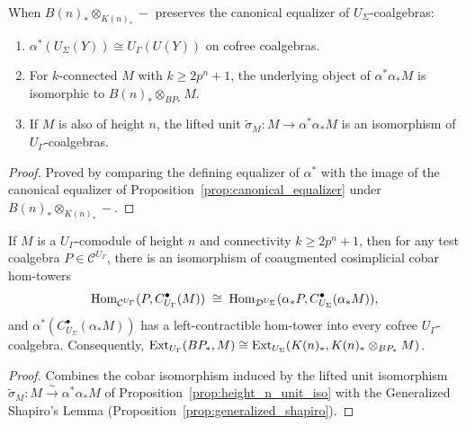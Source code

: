 \begin{proposition}
  \label{prop:height_n_unit_iso}
  \leanok
  When $B(n)_* \otimes_{K(n)_*} -$ preserves the canonical equalizer of $U_{\Sigma}$-coalgebras:
  \begin{enumerate}
    \item $\alpha^*(U_{\Sigma}(Y)) \cong U_{\Gamma}(U(Y))$ on cofree coalgebras.
    \item For $k$-connected $M$ with $k \ge 2p^n + 1$, the underlying object of $\alpha^*\alpha_* M$ is isomorphic to $B(n)_* \otimes_{BP_*} M$.
    \item If $M$ is also of height $n$, the lifted unit $\tilde{\sigma}_M : M \to \alpha^*\alpha_* M$ is an isomorphism of $U_{\Gamma}$-coalgebras.
  \end{enumerate}
\end{proposition}
\begin{proof}
  \leanok
  Proved by comparing the defining equalizer of $\alpha^*$ with the image of the canonical equalizer of Proposition~\ref{prop:canonical_equalizer} under $B(n)_* \otimes_{K(n)_*} -$.
\end{proof}

\begin{theorem}
  \label{thm:unstable_change_of_rings}
  \leanok
  If $M$ is a $U_{\Gamma}$-comodule of height $n$ and connectivity $k \ge 2p^n + 1$, then for any test coalgebra $P \in \mathcal{C}^{U_{\Gamma}}$, there is an isomorphism of coaugmented cosimplicial cobar hom-towers
  \[
    \operatorname{Hom}_{\mathcal{C}^{U_{\Gamma}}}(P, C^{\bullet}_{U_{\Gamma}}(M)) \;\cong\; \operatorname{Hom}_{\mathcal{D}^{U_{\Sigma}}}(\alpha_* P, C^{\bullet}_{U_{\Sigma}}(\alpha_* M)),
  \]
  and $\alpha^*(C^{\bullet}_{U_{\Sigma}}(\alpha_* M))$ has a left-contractible hom-tower into every cofree $U_{\Gamma}$-coalgebra. Consequently, $\operatorname{Ext}_{U_{\Gamma}}(BP_*, M) \cong \operatorname{Ext}_{U_{\Sigma}}(K(n)_*, K(n)_* \otimes_{BP_*} M)$.
\end{theorem}
\begin{proof}
  \leanok
  Combines the cobar isomorphism induced by the lifted unit isomorphism $\tilde{\sigma}_M : M \xrightarrow{\sim} \alpha^*\alpha_* M$ of Proposition~\ref{prop:height_n_unit_iso} with the Generalized Shapiro's Lemma (Proposition~\ref{prop:generalized_shapiro}).
\end{proof}
